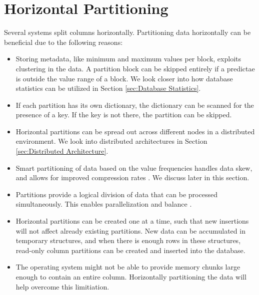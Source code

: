 \section{Horizontal Partitioning}
\label{sec:Horizontal Partitioning}
Several systems split columns horizontally. Partitioning data horizontally can be beneficial due to the following reasons:
\begin{itemize}
  \item Storing metadata, like minimum and maximum values per block, exploits clustering in the data. A partition block can be skipped entirely if a predictae is outside the value range of a block. We look closer into how database statistics can be utilized in Section \ref{sec:Database Statistics}. 
  \item If each partition has its own dictionary, the dictionary can be scanned for the presence of a key. If the key is not there, the partition can be skipped.
  \item Horizontal partitions can be spread out across different nodes in a distributed environment. We look into distributed architectures in Section \ref{sec:Distributed Architecture}.
  \item Smart partitioning of data based on the value frequencies handles data skew, and allows for improved compression rates \cite{Raman2008-gi}. We discuss  later in this section.
  \item Partitions provide a logical division of data that can be processed simultaneously. This enables parallelization and balance \cite{Exasol2014-xh}.
  \item Horizontal partitions can be created one at a time, such that new insertions will not affect already existing partitions. New data can be accumulated in temporary structures, and when there is enough rows in these structures, read-only column partitions can be created and inserted into the database.
  \item The operating system might not be able to provide memory chunks large enough to contain an entire column. Horizontally partitioning the data will help overcome this limitiation.
\end{itemize}




